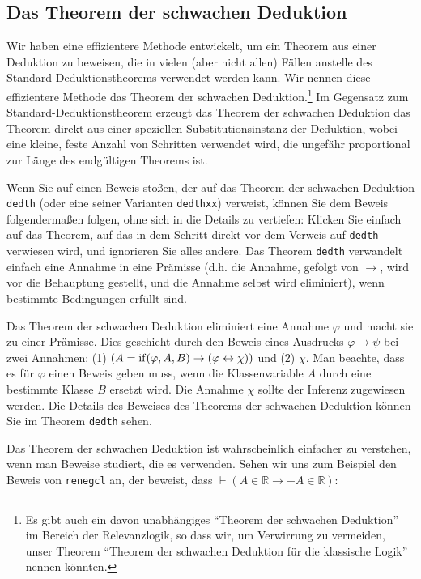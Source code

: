 \subsection{Das Theorem der schwachen Deduktion}\label{weakdeductiontheorem}

Wir haben eine effizientere Methode entwickelt, um ein Theorem aus einer Deduktion zu beweisen, die in vielen (aber nicht allen) Fällen anstelle des Standard-Deduktionstheorems verwendet werden kann. Wir nennen diese effizientere Methode das Theorem der schwachen Deduktion.\footnote{Es gibt auch ein davon unabhängiges "`Theorem der schwachen Deduktion"' im Bereich der Relevanzlogik, so dass wir, um Verwirrung zu vermeiden, unser Theorem "`Theorem der schwachen Deduktion für die klassische Logik"' nennen könnten.} Im Gegensatz zum Standard-Deduktionstheorem erzeugt das Theorem der schwachen Deduktion das Theorem direkt aus einer speziellen Substitutionsinstanz der Deduktion, wobei eine kleine, feste Anzahl von Schritten verwendet wird, die ungefähr proportional zur Länge des endgültigen Theorems ist.

Wenn Sie auf einen Beweis stoßen, der auf das Theorem der schwachen Deduktion \texttt{dedth} (oder eine seiner Varianten \texttt{dedthxx}) verweist, können Sie dem Beweis folgendermaßen folgen, ohne sich in die Details zu vertiefen: Klicken Sie einfach auf das Theorem, auf das in dem Schritt direkt vor dem Verweis auf \texttt{dedth} verwiesen wird, und ignorieren Sie alles andere. Das Theorem \texttt{dedth} verwandelt einfach eine Annahme in eine Prämisse (d.h. die Annahme, gefolgt von $\rightarrow$, wird vor die Behauptung gestellt, und die Annahme selbst wird eliminiert), wenn bestimmte Bedingungen erfüllt sind.

Das Theorem der schwachen Deduktion eliminiert eine Annahme $\varphi$ und macht sie zu einer Prämisse. Dies geschieht durch den Beweis eines Ausdrucks $ \varphi \rightarrow \psi $ bei zwei Annahmen:
(1)
$ ( A = {\rm if} ( \varphi , A , B ) \rightarrow ( \varphi \leftrightarrow \chi ) ) $
und
(2) $\chi$.
Man beachte, dass es für $\varphi$ einen Beweis geben muss, wenn die Klassenvariable $A$ durch eine bestimmte Klasse $B$ ersetzt wird. Die Annahme $\chi$ sollte der Inferenz zugewiesen werden. Die Details des Beweises des Theorems der schwachen Deduktion können Sie im Theorem \texttt{dedth} sehen.

Das Theorem der schwachen Deduktion ist wahrscheinlich einfacher zu verstehen, wenn man Beweise studiert, die es verwenden. Sehen wir uns zum Beispiel den Beweis von \texttt{renegcl} an, der beweist, dass $ \vdash ( A \in \mathbb{R} \rightarrow - A \in \mathbb{R} )$:

